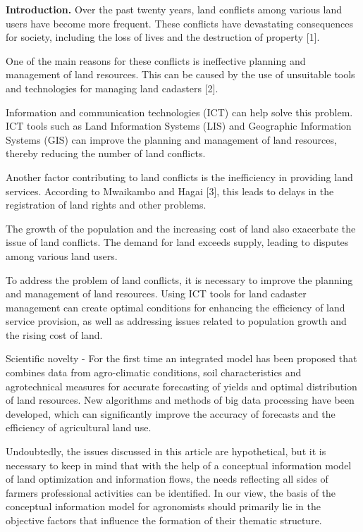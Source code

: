 \begin{multicols}{2}
{\bfseries Introduction.} Over the past twenty years, land conflicts among
various land users have become more frequent. These conflicts have
devastating consequences for society, including the loss of lives and
the destruction of property {[}1{]}.

One of the main reasons for these conflicts is ineffective planning and
management of land resources. This can be caused by the use of
unsuitable tools and technologies for managing land cadasters {[}2{]}.

Information and communication technologies (ICT) can help solve this
problem. ICT tools such as Land Information Systems (LIS) and Geographic
Information Systems (GIS) can improve the planning and management of
land resources, thereby reducing the number of land conflicts.

Another factor contributing to land conflicts is the inefficiency in
providing land services. According to Mwaikambo and Hagai {[}3{]}, this
leads to delays in the registration of land rights and other problems.

The growth of the population and the increasing cost of land also
exacerbate the issue of land conflicts. The demand for land exceeds
supply, leading to disputes among various land users.

To address the problem of land conflicts, it is necessary to improve the
planning and management of land resources. Using ICT tools for land
cadaster management can create optimal conditions for enhancing the
efficiency of land service provision, as well as addressing issues
related to population growth and the rising cost of land.

Scientific novelty - For the first time an integrated model has been
proposed that combines data from agro-climatic conditions, soil
characteristics and agrotechnical measures for accurate forecasting of
yields and optimal distribution of land resources. New algorithms and
methods of big data processing have been developed, which can
significantly improve the accuracy of forecasts and the efficiency of
agricultural land use.

Undoubtedly, the issues discussed in this article are hypothetical, but
it is necessary to keep in mind that with the help of a conceptual
information model of land optimization and information flows, the needs
reflecting all sides of farmers\textquotesingle{} professional
activities can be identified. In our view, the basis of the conceptual
information model for agronomists should primarily lie in the objective
factors that influence the formation of their thematic structure.


\end{multicols}
